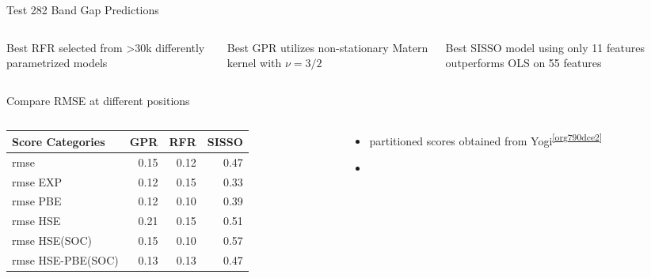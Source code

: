 \documentclass[10pt, aspectratio=169, presentation]{beamer}
\begin{document}
\begin{frame}[label={sec:org25c885c}]{Test 282 Band Gap Predictions}
 
\begin{center}

\end{center}

\begin{columns}
\begin{column}{0.3\columnwidth}
Best RFR selected from >30k differently parametrized models
\end{column}

\begin{column}{0.3\columnwidth}
Best GPR utilizes non-stationary Matern kernel with \(\nu=3\slash{}2\)
\end{column}

\begin{column}{0.3\columnwidth}
Best SISSO model using only 11 features outperforms OLS on 55 features
\end{column}
\end{columns}
\end{frame}

\begin{frame}[label={sec:orgd4dac20}]{Compare RMSE at different positions}
\begin{columns}
\begin{column}{0.5\columnwidth}
\begin{center}
\begin{tabular}{lrrr}
Score Categories & GPR & RFR & SISSO\\[0pt]
\hline
rmse & 0.15 & 0.12 & 0.47\\[0pt]
rmse EXP & 0.12 & 0.15 & 0.33\\[0pt]
rmse PBE & 0.12 & 0.10 & 0.39\\[0pt]
rmse HSE & 0.21 & 0.15 & 0.51\\[0pt]
rmse HSE(SOC) & 0.15 & 0.10 & 0.57\\[0pt]
rmse HSE-PBE(SOC) & 0.13 & 0.13 & 0.47\\[0pt]
\end{tabular}
\end{center}
\end{column}

\begin{column}{0.5\columnwidth}
\begin{itemize}
\item partitioned scores obtained from Yogi\textsuperscript{\ref{org790dce2}}
\item 
\end{itemize}
\end{column}
\end{columns}
\end{frame}
\end{document}
